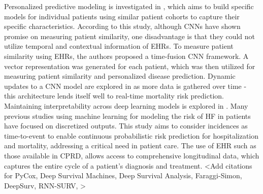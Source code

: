 \documentclass[%
 reprint,
 amsmath,amssymb,
 aps,
]{revtex4-2}
\begin{document}
Personalized predictive modeling is investigated in \cite{suo2017personalized}, which aims to build specific models for individual patients using similar patient cohorts to capture their specific characteristics. According to this study, although CNNs have shown promise on measuring patient similarity, one disadvantage is that they could not utilize temporal and contextual information of EHRs. To measure patient similarity using EHRs, the authors proposed a time-fusion CNN framework. A vector representation was generated for each patient, which was then utilized for measuring patient similarity and personalized disease prediction. Dynamic updates to a CNN model are explored in \cite{brand2018real} as more data is gathered over time - this architecture lends itself well to real-time mortality risk prediction.\\

Maintaining interpretability across deep learning models is explored in \cite{caicedo2019iseeu}. Many previous studies using machine learning for modeling the risk of HF in patients have focused on discretized outputs. This study aims to consider incidences as time-to-event to enable continuous probabilistic risk prediction for hospitalization and mortality, addressing a critical need in patient care. The use of EHR such as those available in CPRD, allows access to comprehensive longitudinal data, which captures the entire cycle of a patient's diagnosis and treatment. <Add citations  for PyCox, Deep Survival Machines, Deep Survival Analysis, Faraggi-Simon, DeepSurv, RNN-SURV, >
\end{document}
